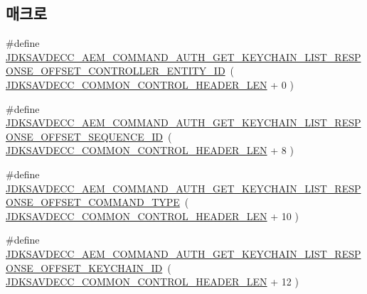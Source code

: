 \subsection*{매크로}
\begin{DoxyCompactItemize}
\item 
\#define \hyperlink{group__command__auth__get__keychain__list__response_ga93d3b8e52cb957b2c63fd4c3a4cb8dc5}{J\+D\+K\+S\+A\+V\+D\+E\+C\+C\+\_\+\+A\+E\+M\+\_\+\+C\+O\+M\+M\+A\+N\+D\+\_\+\+A\+U\+T\+H\+\_\+\+G\+E\+T\+\_\+\+K\+E\+Y\+C\+H\+A\+I\+N\+\_\+\+L\+I\+S\+T\+\_\+\+R\+E\+S\+P\+O\+N\+S\+E\+\_\+\+O\+F\+F\+S\+E\+T\+\_\+\+C\+O\+N\+T\+R\+O\+L\+L\+E\+R\+\_\+\+E\+N\+T\+I\+T\+Y\+\_\+\+ID}~( \hyperlink{group__jdksavdecc__avtp__common__control__header_gaae84052886fb1bb42f3bc5f85b741dff}{J\+D\+K\+S\+A\+V\+D\+E\+C\+C\+\_\+\+C\+O\+M\+M\+O\+N\+\_\+\+C\+O\+N\+T\+R\+O\+L\+\_\+\+H\+E\+A\+D\+E\+R\+\_\+\+L\+EN} + 0 )
\item 
\#define \hyperlink{group__command__auth__get__keychain__list__response_ga45883b610af15219ebcdde5e2557dd1e}{J\+D\+K\+S\+A\+V\+D\+E\+C\+C\+\_\+\+A\+E\+M\+\_\+\+C\+O\+M\+M\+A\+N\+D\+\_\+\+A\+U\+T\+H\+\_\+\+G\+E\+T\+\_\+\+K\+E\+Y\+C\+H\+A\+I\+N\+\_\+\+L\+I\+S\+T\+\_\+\+R\+E\+S\+P\+O\+N\+S\+E\+\_\+\+O\+F\+F\+S\+E\+T\+\_\+\+S\+E\+Q\+U\+E\+N\+C\+E\+\_\+\+ID}~( \hyperlink{group__jdksavdecc__avtp__common__control__header_gaae84052886fb1bb42f3bc5f85b741dff}{J\+D\+K\+S\+A\+V\+D\+E\+C\+C\+\_\+\+C\+O\+M\+M\+O\+N\+\_\+\+C\+O\+N\+T\+R\+O\+L\+\_\+\+H\+E\+A\+D\+E\+R\+\_\+\+L\+EN} + 8 )
\item 
\#define \hyperlink{group__command__auth__get__keychain__list__response_gaf9b956302fdbabd93c13c916f5a8e19e}{J\+D\+K\+S\+A\+V\+D\+E\+C\+C\+\_\+\+A\+E\+M\+\_\+\+C\+O\+M\+M\+A\+N\+D\+\_\+\+A\+U\+T\+H\+\_\+\+G\+E\+T\+\_\+\+K\+E\+Y\+C\+H\+A\+I\+N\+\_\+\+L\+I\+S\+T\+\_\+\+R\+E\+S\+P\+O\+N\+S\+E\+\_\+\+O\+F\+F\+S\+E\+T\+\_\+\+C\+O\+M\+M\+A\+N\+D\+\_\+\+T\+Y\+PE}~( \hyperlink{group__jdksavdecc__avtp__common__control__header_gaae84052886fb1bb42f3bc5f85b741dff}{J\+D\+K\+S\+A\+V\+D\+E\+C\+C\+\_\+\+C\+O\+M\+M\+O\+N\+\_\+\+C\+O\+N\+T\+R\+O\+L\+\_\+\+H\+E\+A\+D\+E\+R\+\_\+\+L\+EN} + 10 )
\item 
\#define \hyperlink{group__command__auth__get__keychain__list__response_ga6e6d2e68496292ac993331f5b02c34fe}{J\+D\+K\+S\+A\+V\+D\+E\+C\+C\+\_\+\+A\+E\+M\+\_\+\+C\+O\+M\+M\+A\+N\+D\+\_\+\+A\+U\+T\+H\+\_\+\+G\+E\+T\+\_\+\+K\+E\+Y\+C\+H\+A\+I\+N\+\_\+\+L\+I\+S\+T\+\_\+\+R\+E\+S\+P\+O\+N\+S\+E\+\_\+\+O\+F\+F\+S\+E\+T\+\_\+\+K\+E\+Y\+C\+H\+A\+I\+N\+\_\+\+ID}~( \hyperlink{group__jdksavdecc__avtp__common__control__header_gaae84052886fb1bb42f3bc5f85b741dff}{J\+D\+K\+S\+A\+V\+D\+E\+C\+C\+\_\+\+C\+O\+M\+M\+O\+N\+\_\+\+C\+O\+N\+T\+R\+O\+L\+\_\+\+H\+E\+A\+D\+E\+R\+\_\+\+L\+EN} + 12 )

\end{DoxyCompactItemize}
